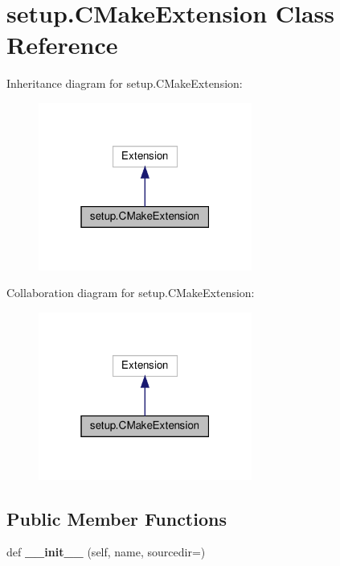 \hypertarget{classsetup_1_1CMakeExtension}{}\section{setup.\+C\+Make\+Extension Class Reference}
\label{classsetup_1_1CMakeExtension}


Inheritance diagram for setup.\+C\+Make\+Extension\+:
\nopagebreak
\begin{figure}[H]
\begin{center}
\leavevmode
\includegraphics[width=199pt]{classsetup_1_1CMakeExtension__inherit__graph}
\end{center}
\end{figure}


Collaboration diagram for setup.\+C\+Make\+Extension\+:
\nopagebreak
\begin{figure}[H]
\begin{center}
\leavevmode
\includegraphics[width=199pt]{classsetup_1_1CMakeExtension__coll__graph}
\end{center}
\end{figure}
\subsection*{Public Member Functions}
\begin{DoxyCompactItemize}
\item 
\mbox{\label{classsetup_1_1CMakeExtension_a2e49eec9170175d7c21d338bad44c6aa}} 
def {\bfseries \+\_\+\+\_\+init\+\_\+\+\_\+} (self, name, sourcedir=\textquotesingle{}\textquotesingle{})
\end{DoxyCompactItemize}
